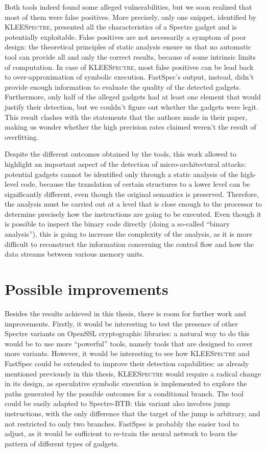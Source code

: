 \documentclass[target=mst,aauheader=aics]{thud}
\theoremstyle{definition}
\begin{document}
Both tools indeed found some alleged vulnerabilities, but we soon realized that most of them were false positives. More precisely, only one snippet, identified by \textsc{KLEESpectre}, presented all the characteristics of a Spectre gadget and is potentially exploitable. False positives are not necessarily a symptom of poor design: the theoretical principles of static analysis ensure us that no automatic tool can provide all and only the correct results, because of some intrinsic limits of computation. In case of \textsc{KLEESpectre}, most false positives can be lead back to over-approximation of symbolic execution. FastSpec's output, instead, didn't provide enough information to evaluate the quality of the detected gadgets. Furthermore, only half of the alleged gadgets had at least one element that would justify their detection, but we couldn't figure out whether the gadgets were legit. This result clashes with the statements that the authors made in their paper, making us wonder whether the high precision rates claimed weren't the result of overfitting.

Despite the different outcomes obtained by the tools, this work allowed to highlight an important aspect of the detection of micro-architectural attacks: potential gadgets cannot be identified only through a static analysis of the high-level code, because the translation of certain structures to a lower level can be significantly different, even though the original semantics is preserved. Therefore, the analysis must be carried out at a level that is close enough to the processor to determine precisely how the instructions are going to be executed. Even though it is possible to inspect the binary code directly (doing a so-called ``binary analysis''), this is going to increase the complexity of the analysis, as it is more difficult to reconstruct the information concerning the control flow and how the data streams between various memory units.

\section{Possible improvements}
Besides the results achieved in this thesis, there is room for further work and improvements. Firstly, it would be interesting to test the presence of other Spectre variants on OpenSSL cryptographic libraries: a natural way to do this would be to use more ``powerful'' tools, namely tools that are designed to cover more variants. However, it would be interesting to see how \textsc{KLEESpectre} and FastSpec could be extended to improve their detection capabilities: as already mentioned previously in this thesis, \textsc{KLEESpectre} would require a radical change in its design, as speculative symbolic execution is implemented to explore the paths generated by the possible outcomes for a conditional branch. The tool could be easily adapted to Spectre-BTB: this variant also involves jump instructions, with the only difference that the target of the jump is arbitrary, and not restricted to only two branches. FastSpec is probably the easier tool to adjust, as it would be sufficient to re-train the neural network to learn the pattern of different types of gadgets.
\end{document}
